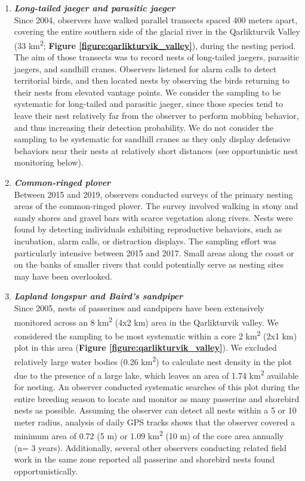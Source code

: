 \documentclass[a4paper,twoside,12pt]{article}
\begin{document}
\begin{enumerate}[label=\roman*]
	\item[] \textit{\textbf{Long-tailed jaeger and parasitic jaeger}} \\
	Since 2004, observers have walked parallel transects spaced 400 meters apart, covering the entire southern side of the glacial river in the Qarlikturvik Valley (33 km\textsuperscript{2}; \textbf{Figure \ref{figure:qarlikturvik_valley}}), during the nesting period. The aim of those transects was to record nests of long-tailed jaegers, parasitic jaegers, and sandhill cranes. Observers listened for alarm calls to detect territorial birds, and then located nests by observing the birds returning to their nests from elevated vantage points. We consider the sampling to be systematic for long-tailed and parasitic jaeger, since those species tend to leave their nest relatively far from the observer to perform mobbing behavior, and thus increasing their detection probability. We do not consider the sampling to be systematic for sandhill cranes as they only display defensive behaviors near their nests at relatively short distances (see opportunistic nest monitoring below).\\
	
	\item[] \textit{\textbf{Common-ringed plover}} \\
	Between 2015 and 2019, observers conducted surveys of the primary nesting areas of the common-ringed plover. The survey involved walking in stony and sandy shores and gravel bars with scarce vegetation along rivers. Nests were found by detecting individuals exhibiting reproductive behaviors, such as incubation, alarm calls, or distraction displays. The sampling effort was particularly intensive between 2015 and 2017. Small areas along the coast or on the banks of smaller rivers that could potentially serve as nesting sites may have been overlooked.\\
	
	\item[] \textit{\textbf{Lapland longspur and Baird's sandpiper}}\\
	Since 2005, nests of passerines and sandpipers have been extensively monitored across an 8 km\textsuperscript{2} (4x2 km) area in the Qarlikturvik valley. We considered the sampling to be most systematic within a core 2 km\textsuperscript{2} (2x1 km) plot in this area (\textbf{Figure \ref{figure:qarlikturvik_valley}}). We excluded relatively large water bodies (0.26 km\textsuperscript{2}) to calculate nest density in the plot due to the presence of a large lake, which leaves an area of 1.74 km\textsuperscript{2} available for nesting. An observer conducted systematic searches of this plot during the entire breeding season to locate and monitor as many passerine and shorebird nests as possible. Assuming the observer can detect all nests within a 5 or 10 meter radius, analysis of daily GPS tracks shows that the observer covered a minimum area of 0.72  (5 m) or 1.09  km\textsuperscript{2} (10 m) of the core area annually (n= 3 years). Additionally, several other observers conducting related field work in the same zone reported all passerine and shorebird nests found opportunistically.\\
	

\end{enumerate}
\end{document}
